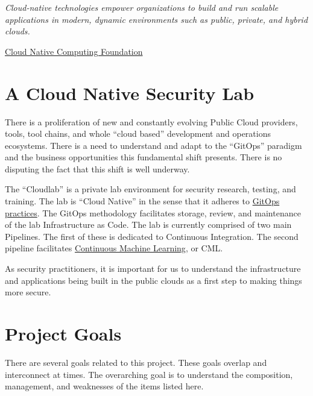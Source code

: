 







\begin{displayquote}
	\emph{Cloud-native technologies empower organizations to build and run scalable applications in modern, dynamic environments such as public,
		private, and hybrid clouds.}

	\href{https://www.cncf.io/about/who-we-are/}{Cloud Native Computing Foundation}
\end{displayquote}

\section{\label{sec:Start}A Cloud Native Security Lab}
\vspace{2mm}
\justifying
There is a proliferation of new and constantly evolving Public Cloud providers, tools, tool chains, and whole
``cloud based'' development and operations ecosystems. There is a need to understand and adapt to the ``GitOps'' paradigm and the
business opportunities this fundamental shift presents. There is no disputing the fact that this shift is well underway\cite{CloudShift}.

\justifying
The ``Cloudlab'' is a private lab environment for security research, testing, and training. The lab is ``Cloud Native'' in the sense that it
adheres to \href{https://www.cloudbees.com/gitops/what-is-gitops}{GitOps practices}. The GitOps methodology facilitates storage, review, and
maintenance of the lab Infrastructure as Code. The lab is currently comprised of two main Pipelines. The first of these is dedicated to
Continuous Integration. The second pipeline facilitates \href{https://cml.dev/doc}{Continuous Machine Learning}, or CML\cite{books/mit/026233758}.

\justifying
As security practitioners, it is important for us to understand the infrastructure and applications being built in the public
clouds as a first step to making things more secure.

\section{\label{sec:Project}Project Goals}
\vspace{2mm}
\justifying
There are several goals related to this project. These goals overlap and interconnect at times. The overarching goal is to understand the composition,
management, and weaknesses of the items listed here.

